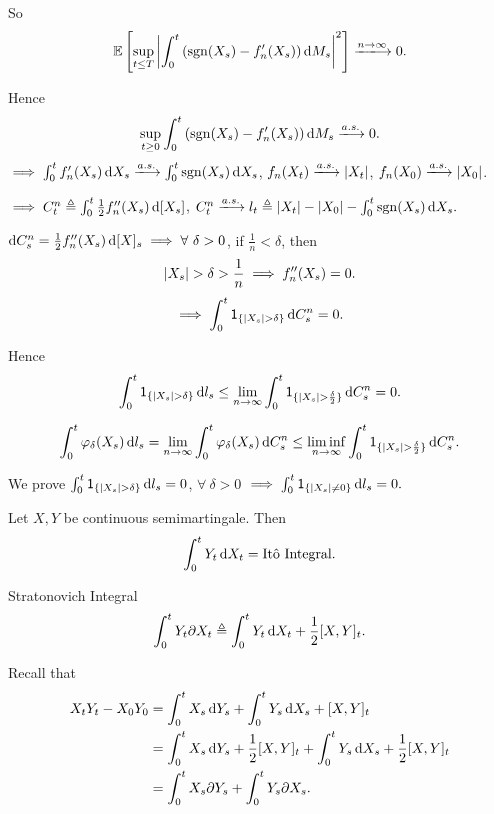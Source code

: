 {    So $$
    \mathbb{E}\left[ \sup_{t \leq T} \abs{ \int_0^t \left( \mathrm{sgn}(X_s) - f_n'(X_s) \right) \diff M_s}^2  \right] \xlongrightarrow{n \to \infty} 0.
    $$

    Hence 
    $$
    \sup_{t \geq 0} \int_0^t \left( \mathrm{sgn}(X_s) - f_n'(X_s) \right) \diff M_s \xlongrightarrow{a.s.} 0.
    $$
    $\implies \int_0^t f_n'(X_s) \diff X_s \xlongrightarrow{a.s.} \int_0^t \mathrm{sgn}(X_s) \diff  X_s$, $f_n(X_t) \xlongrightarrow{a.s.} \abs{ X_t }$, $f_n(X_0) \xlongrightarrow{a.s.} \abs{ X_0 }$.
    
    $\implies C_t^n \triangleq \int_0^t \frac{1}{2} f_n''(X_s) \mathop{}\!\mathrm{d} [X_s]$, $C_t^n \xlongrightarrow{a.s.} l_t \triangleq \abs{ X_t } - \abs{ X_0 } - \int_0^t \mathrm{sgn}(X_s) \diff X_s.$

    $\mathop{}\!\mathrm{d} C_s^n = \frac{1}{2}f_n''(X_s) \mathop{}\!\mathrm{d} [X]_s \implies \forall~ \delta > 0$, if $\frac{1}{n} < \delta$, then
    $$
        \left|  X_s  \right| > \delta > \frac{1}{n} \implies f_n''(X_s) = 0.
    $$
    $$
    \implies\int_0^t \mathsf{1}_{\{\left|  X_s  \right| > \delta\}} \mathop{}\!\mathrm{d} C_s^n = 0.
    $$

    Hence $$\int_0^t \mathsf{1}_{\{\abs{ X_s }> \delta\}} \diff  l_s \leq \lim_{n \to \infty} \int_0^t \mathsf{1}_{\{\abs{ X_s }> \frac{\delta}{2}\}} \diff C_s^n = 0.$$

    $$
    \int_0^t \varphi_\delta(X_s) \mathop{}\!\mathrm{d} l_s = \lim_{n\to \infty}\int_0^t \varphi_\delta(X_s) \mathop{}\!\mathrm{d} C_s^n \leq \liminf_{n \to \infty} \int_0^t \mathsf{1}_{\{\left|  X_s  \right| > \frac{\delta}{2}\}} \mathop{}\!\mathrm{d}  C_s^n.
    $$

    We prove $\int_0^t \mathsf{1}_{\{\abs{ X_s }> \delta\}}\diff l_s = 0$, $\forall~ \delta >0$ $\implies \int_0^t \mathsf{1}_{\{\left|  X_s  \right| \neq 0\}} \mathop{}\!\mathrm{d}  l_s =0.$
} 

Let $X,Y$ be continuous semimartingale. Then 
$$
\int_0^t Y_t \mathop{}\!\mathrm{d} X_t = \text{It\^o Integral.}
$$

Stratonovich Integral
$$
\int_0^t Y_t \partial X_t \triangleq \int_0^t Y_t \mathop{}\!\mathrm{d} X_t + \frac{1}{2}[X,Y]_{t}.
$$

Recall that 
$$
\begin{aligned}
X_t Y_t - X_0 Y_0 &= \int_0^t X_s \mathop{}\!\mathrm{d} Y_s + \int_0^t Y_s \mathop{}\!\mathrm{d} X_s + [X,Y]_t \\&= \int_0^t X_s \mathop{}\!\mathrm{d} Y_s + \frac{1}{2}[X,Y]_t + \int_0^tY_s \mathop{}\!\mathrm{d} X_s + \frac{1}{2}[X,Y]_t\\
&=\int_0^t X_s \partial Y_s + \int_0^t Y_s \partial X_s.
\end{aligned}
$$


